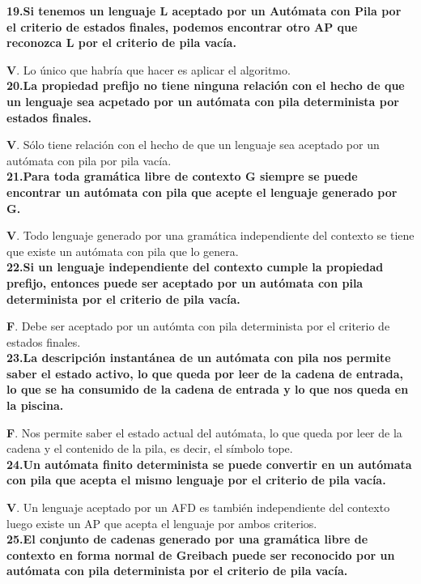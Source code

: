 \documentclass[a4paper,11pt]{article}
\begin{document}
\textbf{19.Si tenemos un lenguaje L aceptado por un Autómata con Pila por el criterio de estados finales, podemos encontrar otro AP que reconozca L por el criterio de pila vacía.}

\textbf{V}. Lo único que habría que hacer es aplicar el algoritmo. \\

\textbf{20.La propiedad prefijo no tiene ninguna relación con el hecho de que un lenguaje sea acpetado por un autómata con pila determinista por estados finales.}

\textbf{V}. Sólo tiene relación con el hecho de que un lenguaje sea aceptado por un autómata con pila por pila vacía. \\

\textbf{21.Para toda gramática libre de contexto G siempre se puede encontrar un autómata con pila que acepte el lenguaje generado por G.}

\textbf{V}. Todo lenguaje generado por una gramática independiente del contexto se tiene que existe un autómata con pila que lo genera. \\

\textbf{22.Si un lenguaje independiente del contexto cumple la propiedad prefijo, entonces puede ser aceptado por un autómata con pila determinista por el criterio de pila vacía.}

\textbf{F}. Debe ser aceptado por un autómta con pila determinista por el criterio de estados finales. \\

\textbf{23.La descripción instantánea de un autómata con pila nos permite saber el estado activo, lo que queda por leer de la cadena de entrada, lo que se ha consumido de la cadena de entrada y lo que nos queda en la piscina.}

\textbf{F}. Nos permite saber el estado actual del autómata, lo que queda por leer de la cadena y el contenido de la pila, es decir, el símbolo tope. \\

\textbf{24.Un autómata finito determinista se puede convertir en un autómata con pila que acepta el mismo lenguaje por el criterio de pila vacía.}

\textbf{V}. Un lenguaje aceptado por un AFD es también independiente del contexto luego existe un AP que acepta el lenguaje por ambos criterios. \\

\textbf{25.El conjunto de cadenas generado por una gramática libre de contexto en forma normal de Greibach puede ser reconocido por un autómata con pila determinista por el criterio de pila vacía.}
\end{document}
